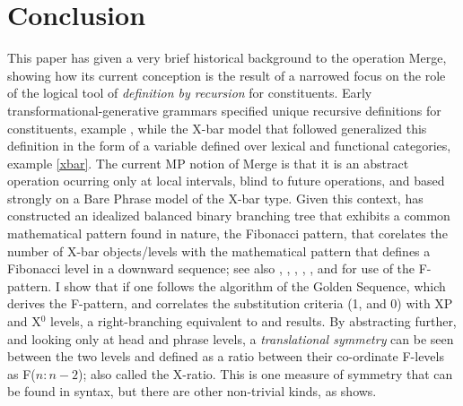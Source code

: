\documentclass[11pt,twoside]{article}
\theoremstyle{plain}
\numberwithin{equation}{section}
\theoremstyle{definition}
\newtheorem{phrase string}{Phrase String}
\begin{document}
\section*{Conclusion}
This paper has given a very brief historical background to the operation Merge, showing how its current conception is the result of a narrowed focus on the role of the logical tool of \textsl{definition by recursion} for constituents. Early transformational-generative grammars specified unique recursive definitions for constituents, example , while the X-bar model that followed generalized this definition in the form of a variable defined over lexical and functional categories, example \ref{xbar}. The current MP notion of Merge is that it is an abstract operation ocurring only at local intervals, blind to future operations, and based strongly on a Bare Phrase model of the X-bar type. Given this context, \cite{medeiros:2008} has constructed an idealized balanced binary branching tree that exhibits a common mathematical pattern found in nature, the Fibonacci pattern, that corelates the number of X-bar objects/levels with the mathematical pattern that defines a Fibonacci level in a downward sequence; see also \cite{uriagereka:1998}, \cite{cm:2005}, \cite{bcm:2006}, \cite{idsardi:2008}, \cite{soschen:2008}, and \cite{ppuriagereka:2008} for use of the F-pattern. I show that if one follows the algorithm of the Golden Sequence, which derives the F-pattern, and correlates the substitution criteria (1, and 0) with XP and X$^{0}$ levels, a right-branching equivalent to \cite{medeiros:2008} and \cite{soschen:2008} results. By abstracting further, and looking only at head and phrase levels, a \textsl{translational symmetry} can be seen between the two levels and defined as a ratio between their co-ordinate F-levels as F($n : n-2$); also called the X-ratio. This is one measure of symmetry that can be found in syntax, but there are other non-trivial kinds, as \cite{boeckx08bare} shows. 
\end{document}
